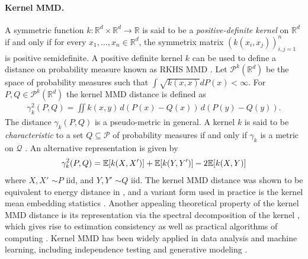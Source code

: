 \documentclass{article}
\theoremstyle{definition}
\newcommand{\reals}{\mathbb{R}}
\newcommand{\ex}[1]{\ensuremath{\mathbb{E}\left[ #1\right]}}
\newcommand{\cP}{\mathcal{P}}
\newcommand{\cQ}{\mathcal{Q}}
\let\originalleft\left
\let\originalright\right
\renewcommand{\left}{\mathopen{}\mathclose\bgroup\originalleft}
\renewcommand{\right}{\aftergroup\egroup\originalright}
\begin{document}
\paragraph{Kernel MMD.}
A symmetric function $k\colon \reals^d \times \reals^d \rightarrow \reals$ is said to be a \emph{positive-definite kernel} on $\reals^d$ if and only if  for every $x_1, \dots, x_n \in \reals^d$, the symmetrix matrix $(k(x_i, x_j))_{i,j=1}^n$ is positive semidefinite.  A positive definite kernel $k$ can be used to define a distance on probability measure
known as RKHS MMD \cite{anderson1994two, gretton2005measuring, smola2007hilbert, gretton2012kernel}.
 Let $\cP^k(\reals^d)$ be the space of probability measures such that $\int \sqrt{k(x,x)} d P(x) < \infty $. For $P, Q \in \cP^k(\reals^d)$ the kernel MMD distance is defined as
\begin{align*}
    \gamma^2_k(P,Q) = \iint k(x,y) \, d(P(x) - Q(x))\, d(P(y) - Q(y)) .
\end{align*}
The  distance $\gamma_k(P,Q)$ is a pseudo-metric in general.  A kernel $k$ is said to be \emph{characteristic} to a set $Q \subseteq\cP$ of probability measures if and only if $\gamma_k$ is a metric on $\cQ$ \cite{gretton2012kernel,sriperumbudur2010hilbert}.
%
An alternative representation is given by
\begin{align}
    \gamma^2_k(P,Q) = \ex{ k(X,X')} + \ex{k(Y,Y')} - 2 \ex{ k(X,Y)} \label{eq_gamma_k_alt}
\end{align}
where $X,X'$  $\sim P$  iid, and $Y,Y'$ $\sim Q$ iid. The kernel MMD distance was shown  to be equivalent to energy distance in \cite{sejdinovic2013equivalence},
and a variant form 
used in practice is the kernel mean embedding statistics \cite{8187176, chwialkowski2015fast, jitkrittum2016interpretable}. 
Another appealing theoretical property of the kernel MMD distance is
its representation via the spectral decomposition of the kernel \cite{epps1986omnibus, fernandez2008test},
which gives rise to estimation consistency as well as practical algorithms of computing \cite{zhao2015fastmmd}.  
Kernel MMD has been widely applied in  data analysis and machine learning, including independence testing  \cite{fukumizu2008kernel,zhang2012kernel}
and generative modeling \cite{li2015generative,li2017mmd}.
\end{document}
